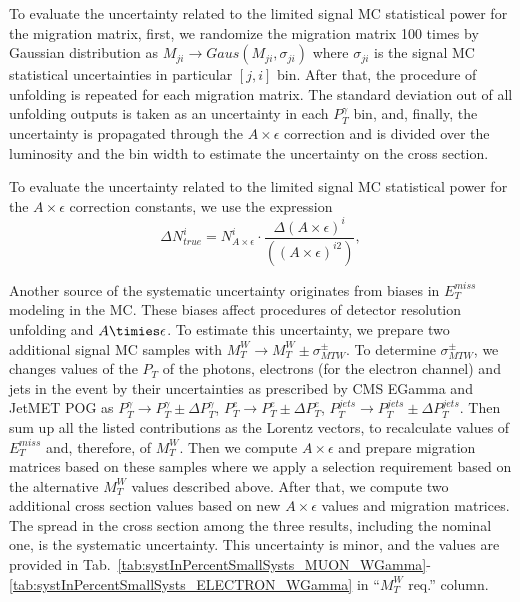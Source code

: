 To evaluate the uncertainty related to the limited signal MC statistical power for the migration matrix, first, we randomize the migration matrix 100 times by Gaussian distribution as $M_{ji}\rightarrow Gaus(M_{ji},\sigma_{ji})$ where $\sigma_{ji}$ is the signal MC statistical uncertainties in particular $[j,i]$ bin. After that, the procedure of unfolding is repeated for each migration matrix. The standard deviation out of all unfolding outputs is taken as an uncertainty in each $P_T^{\gamma}$ bin, and, finally, the uncertainty is propagated through the $A\times\epsilon$ correction and is divided over the luminosity and the bin width to estimate the uncertainty on the cross section.

To evaluate the uncertainty related to the limited signal MC statistical power for the $A \times \epsilon$ correction constants, we use the expression
\begin{equation}
\Delta N_{true}^i= N_{A\times \epsilon}^i \cdot \frac{\Delta{(A\times \epsilon)^i}} { ((A\times \epsilon)^{i2})}, 
\end{equation}


Another source of the systematic uncertainty originates from biases in $E_T^{miss}$ modeling in the MC. These biases affect procedures of detector resolution unfolding and $A\timies\epsilon$. To estimate this uncertainty, we prepare two additional signal MC samples with $M_T^{W} \rightarrow M_T^W \pm \sigma^{\pm}_{MTW}$. To determine $\sigma^{\pm}_{MTW}$, we changes values of the $P_T$ of the photons, electrons (for the electron channel) and jets in the event by their uncertainties as prescribed by CMS EGamma and JetMET POG as $P_T^{\gamma}\rightarrow P_T^{\gamma} \pm \Delta P_T^{\gamma}$, $P_T^{e}\rightarrow P_T^{e} \pm \Delta P_T^{e}$, $P_T^{jets}\rightarrow P_T^{jets} \pm \Delta P_T^{jets}$. Then sum up all the listed contributions as the Lorentz vectors, to recalculate values of $E_T^{miss}$ and, therefore, of $M_T^{W}$. Then we compute $A \times \epsilon$ and prepare migration matrices based on these samples where we apply a selection requirement based on the alternative $M_T^{W}$ values described above. After that, we compute two additional cross section values based on new $A\times\epsilon$ values and migration matrices. The spread in the cross section among the three results, including the nominal one, is the systematic uncertainty. This uncertainty is minor, and the values are provided in Tab.~\ref{tab:systInPercentSmallSysts_MUON_WGamma}-\ref{tab:systInPercentSmallSysts_ELECTRON_WGamma} in ``$M_T^W$ req.'' column.

